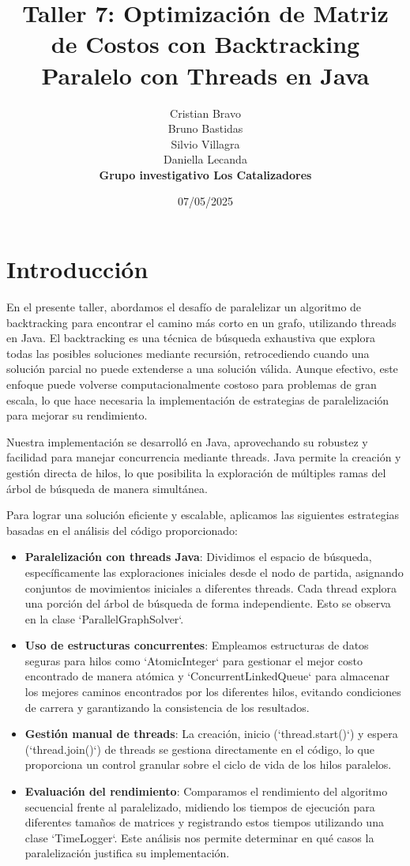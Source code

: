 \documentclass[12pt]{article}
\title{Taller 7: Optimización de Matriz de Costos con Backtracking Paralelo con Threads en Java}
\author{
  Cristian Bravo \\
  Bruno Bastidas \\
  Silvio Villagra \\
  Daniella Lecanda \\[2ex]
  \textbf{Grupo investigativo Los Catalizadores}
}
\date{07/05/2025}
\begin{document}
\maketitle
\clearpage

\section*{Introducción}

En el presente taller, abordamos el desafío de paralelizar un algoritmo de backtracking para encontrar el camino más corto en un grafo, utilizando threads en Java. El backtracking es una técnica de búsqueda exhaustiva que explora todas las posibles soluciones mediante recursión, retrocediendo cuando una solución parcial no puede extenderse a una solución válida. Aunque efectivo, este enfoque puede volverse computacionalmente costoso para problemas de gran escala, lo que hace necesaria la implementación de estrategias de paralelización para mejorar su rendimiento.

Nuestra implementación se desarrolló en Java, aprovechando su robustez y facilidad para manejar concurrencia mediante threads. Java permite la creación y gestión directa de hilos, lo que posibilita la exploración de múltiples ramas del árbol de búsqueda de manera simultánea.

Para lograr una solución eficiente y escalable, aplicamos las siguientes estrategias basadas en el análisis del código proporcionado:
\begin{itemize}
    \item \textbf{Paralelización con threads Java}: Dividimos el espacio de búsqueda, específicamente las exploraciones iniciales desde el nodo de partida, asignando conjuntos de movimientos iniciales a diferentes threads. Cada thread explora una porción del árbol de búsqueda de forma independiente. Esto se observa en la clase `ParallelGraphSolver`.
    \item \textbf{Uso de estructuras concurrentes}: Empleamos estructuras de datos seguras para hilos como `AtomicInteger` para gestionar el mejor costo encontrado de manera atómica y `ConcurrentLinkedQueue` para almacenar los mejores caminos encontrados por los diferentes hilos, evitando condiciones de carrera y garantizando la consistencia de los resultados.
    \item \textbf{Gestión manual de threads}: La creación, inicio (`thread.start()`) y espera (`thread.join()`) de threads se gestiona directamente en el código, lo que proporciona un control granular sobre el ciclo de vida de los hilos paralelos.
    \item \textbf{Evaluación del rendimiento}: Comparamos el rendimiento del algoritmo secuencial frente al paralelizado, midiendo los tiempos de ejecución para diferentes tamaños de matrices y registrando estos tiempos utilizando una clase `TimeLogger`. Este análisis nos permite determinar en qué casos la paralelización justifica su implementación.
\end{itemize}
\end{document}
